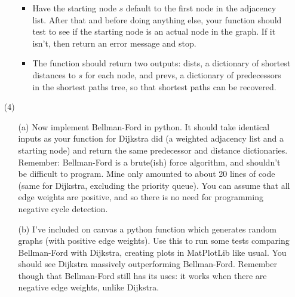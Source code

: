 \documentclass[12pt]{article}
\begin{document}
\begin{enumerate}
\begin{itemize}
\begin{itemize}
            \item Have the starting node $s$ default to the first node in the adjacency list. After that and before doing anything else, your function should test to see if the starting node is an actual node in the graph. If it isn't, then return an error message and stop.
            \item The function should return two outputs: dists, a dictionary of shortest distances to $s$ for each node, and prevs, a dictionary of predecessors in the shortest paths tree, so that shortest paths can be recovered. 
        \end{itemize} 
    \end{itemize}
    \item[(4)] 
    \begin{itemize}
        \item[(a)] Now implement Bellman-Ford in python. It should take identical inputs as your function for Dijkstra did (a weighted adjacency list and a starting node) and return the same predecessor and distance dictionaries. Remember: Bellman-Ford is a brute(ish) force algorithm, and shouldn't be difficult to program. Mine only amounted to about 20 lines of code (same for Dijkstra, excluding the priority queue). You can assume that all edge weights are positive, and so there is no need for programming negative cycle detection. 
        \item[(b)] I've included on canvas a python function which generates random graphs (with positive edge weights). Use this to run some tests comparing Bellman-Ford with Dijkstra, creating plots in MatPlotLib like usual. You should see Dijkstra massively outperforming Bellman-Ford. Remember though that Bellman-Ford still has its uses: it works when there are negative edge weights, unlike Dijkstra. 
    \end{itemize}
    
\end{enumerate}
\end{document}
